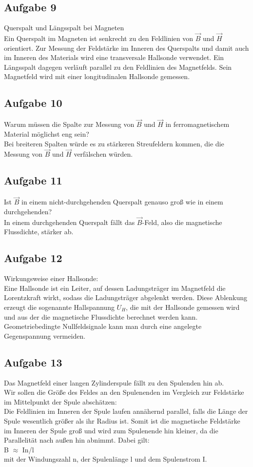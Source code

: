 \documentclass[a4paper,10pt]{scrartcl}
\begin{document}
\subsection{Aufgabe 9}
Querspalt und Längsspalt bei Magneten \\
Ein Querspalt im Magneten ist senkrecht zu den Feldlinien von $\vec{B}$ und $\vec{H}$ orientiert. Zur Messung der Feldstärke im Inneren des Querspalts und damit auch im Inneren des Materials wird eine transversale Hallsonde verwendet.
Ein Längsspalt dagegen verläuft parallel zu den Feldlinien des Magnetfelds. Sein Magnetfeld wird mit einer longitudinalen Hallsonde gemessen.
\subsection{Aufgabe 10}
Warum müssen die Spalte zur Messung von $\vec{B}$ und $\vec{H}$ in ferromagnetischem Material möglichst eng sein? \\
Bei breiteren Spalten würde es zu stärkeren Streufeldern kommen, die die Messung von $\vec{B}$ und $\vec{H}$ verfälschen würden.
\subsection{Aufgabe 11}
Ist $\vec{B}$ in einem nicht-durchgehenden Querspalt genauso groß wie in einem durchgehenden? \\
In einem durchgehenden Querspalt fällt das $\vec{B}$-Feld, also die magnetische Flussdichte, stärker ab.
\subsection{Aufgabe 12}
Wirkungsweise einer Hallsonde: \\
Eine Hallsonde ist ein Leiter, auf dessen Ladungsträger im Magnetfeld die Lorentzkraft wirkt, sodass die Ladungsträger abgelenkt werden. Diese Ablenkung erzeugt die sogenannte Hallspannung $U_H$, die mit der Hallsonde gemessen wird und aus der die magnetische Flussdichte berechnet werden kann. \\
Geometriebedingte Nullfeldsignale kann man durch eine angelegte Gegenspannung vermeiden.
\subsection{Aufgabe 13}
Das Magnetfeld einer langen Zylinderspule fällt zu den Spulenden hin ab. \\
Wir sollen die Größe des Feldes an den Spulenenden im Vergleich zur Feldstärke im Mittelpunkt der Spule abschätzen: \\
Die Feldlinien im Inneren der Spule laufen annähernd parallel, falls die Länge der Spule wesentlich größer als ihr Radius ist. Somit ist die magnetische Feldstärke im Inneren der Spule groß und wird zum Spulenende hin kleiner, da die Parallelität nach außen hin abnimmt. Dabei gilt: \\
B $\approx$ In/l \\
mit der Windungszahl n, der Spulenlänge l und dem Spulenstrom I.
\end{document}
